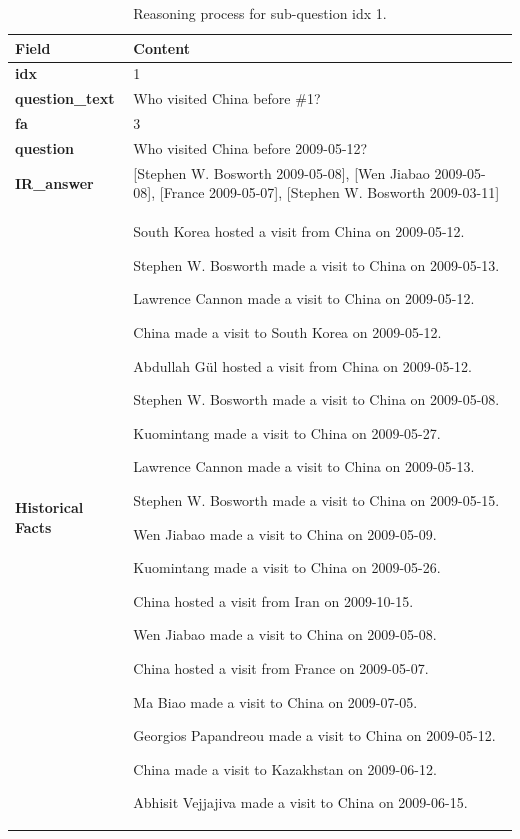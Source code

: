 \documentclass[11pt]{article}
\begin{document}
\begin{table}[t]
\caption{Reasoning process for sub-question idx 1.}
\label{tab:example-sub2}
\centering
\small
\begin{tabular}{p{} p{}}
\toprule
\textbf{Field} & \textbf{Content} \\
\midrule
\textbf{idx} & 1 \\
\textbf{question\_text} & Who visited China before \#1? \\
\textbf{fa} & 3 \\
\textbf{question} & Who visited China before 2009-05-12? \\
\textbf{IR\_answer} & [Stephen W. Bosworth 2009-05-08], [Wen Jiabao 2009-05-08], [France 2009-05-07], [Stephen W. Bosworth 2009-03-11] \\
\midrule
\textbf{Historical Facts} &
South Korea hosted a visit from China on 2009-05-12. \par
Stephen W. Bosworth made a visit to China on 2009-05-13. \par
Lawrence Cannon made a visit to China on 2009-05-12. \par
China made a visit to South Korea on 2009-05-12. \par
Abdullah Gül hosted a visit from China on 2009-05-12. \par
Stephen W. Bosworth made a visit to China on 2009-05-08. \par
Kuomintang made a visit to China on 2009-05-27. \par
Lawrence Cannon made a visit to China on 2009-05-13. \par
Stephen W. Bosworth made a visit to China on 2009-05-15. \par
Wen Jiabao made a visit to China on 2009-05-09. \par
Kuomintang made a visit to China on 2009-05-26. \par
China hosted a visit from Iran on 2009-10-15. \par
Wen Jiabao made a visit to China on 2009-05-08. \par
China hosted a visit from France on 2009-05-07. \par
Ma Biao made a visit to China on 2009-07-05. \par
Georgios Papandreou made a visit to China on 2009-05-12. \par
China made a visit to Kazakhstan on 2009-06-12. \par
Abhisit Vejjajiva made a visit to China on 2009-06-15. \par

\end{tabular}
\end{table}
\end{document}
